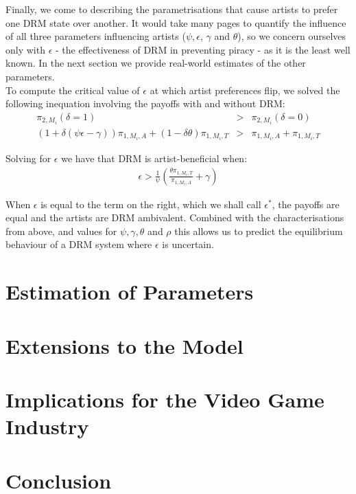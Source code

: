 \documentclass[a4paper,12pt]{article}
\numberwithin{equation}{section}
\newcommand{\artistpayoff}[2]{\pi_{#1, M_{#2}}}
\newcommand{\artistalbum}[2]{\pi_{#1, M_{#2}, A}}
\newcommand{\artistticket}[2]{\pi_{#1, M_{#2}, T}}
\newcommand{\drminf}{(\psi \epsilon - \gamma)}
\begin{document}
Finally, we come to describing the parametrisations that cause artists to prefer one DRM state over another. It would take many pages to quantify the influence of all three parameters influencing artists ($\psi, \epsilon$, $\gamma$ and $\theta$), so we concern ourselves only with $\epsilon$ - the effectiveness of DRM in preventing piracy - as it is the least well known. In the next section we provide real-world estimates of the other parameters.\\

To compute the critical value of $\epsilon$ at which artist preferences flip, we solved the following inequation involving the payoffs with and without DRM:
\begin{eqnarray*}
\artistpayoff{2}{i}(\delta = 1) & > & \artistpayoff{2}{i}(\delta = 0)\\
(1 + \delta \drminf) \artistalbum{1}{i} + (1 - \delta \theta) \artistticket{1}{i} & > & \artistalbum{1}{i} + \artistticket{1}{i}
\end{eqnarray*}

Solving for $\epsilon$ we have that DRM is artist-beneficial when:
\begin{eqnarray}
\epsilon > \frac{1}{\psi} \left( \frac{\theta \artistticket{1}{i}}{\artistalbum{1}{i}} + \gamma \right)
\end{eqnarray}

When $\epsilon$ is equal to the term on the right, which we shall call $\epsilon^*$, the payoffs are equal and the artists are DRM ambivalent. Combined with the characterisations from above, and values for $\psi, \gamma, \theta$ and $\rho$ this allows us to predict the equilibrium behaviour of a DRM system where $\epsilon$ is uncertain.

\pagebreak
\section{Estimation of Parameters} \label{Sec:Estimates}

\section{Extensions to the Model} \label{Sec:Extensions}

\section{Implications for the Video Game Industry}

\section{Conclusion}



\end{document}
